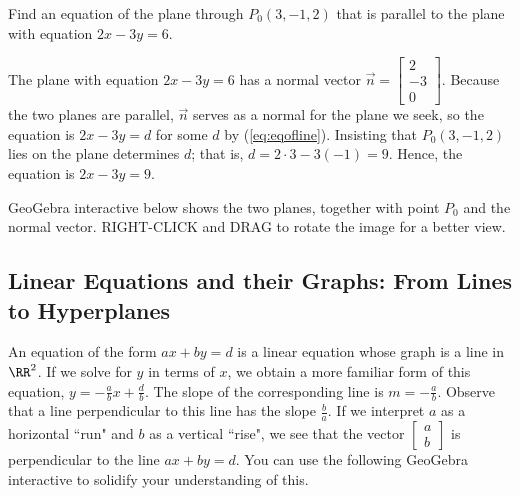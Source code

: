 \documentclass{ximera}
\begin{document}
\begin{example}\label{ex:planeparalleltoplane}
Find an equation of the plane through $P_{0}(3, -1, 2)$ that is parallel to the plane with equation $2x - 3y = 6$.

\begin{explanation}
The plane with equation $2x -3y = 6$ has a normal vector $\vec{n} =
\begin{bmatrix}
2\\
-3\\
0
\end{bmatrix}$. Because the two planes are parallel, $\vec{n}$ serves as a normal for the plane we seek, so the equation is $2x - 3y = d$ for some $d$ by (\ref{eq:eqofline}). Insisting that $P_{0}(3, -1, 2)$ lies on the plane determines $d$; that is, $d = 2 \cdot 3 - 3(-1) = 9$. Hence, the equation is $2x - 3y = 9$.

GeoGebra interactive below shows the two planes, together with point $P_0$ and the normal vector.  RIGHT-CLICK and DRAG to rotate the image for a better view.


\begin{onlineOnly}
\begin{center} 
\end{center}
\end{onlineOnly}
\end{explanation}
\end{example}

\subsection*{Linear Equations and their Graphs: From Lines to Hyperplanes}
An equation of the form $ax+by=d$ is a linear equation whose graph is a line in $\RR^2$. If we solve for $y$ in terms of $x$, we obtain a more familiar form of this equation, $y=-\frac{a}{b}x+\frac{d}{b}$.  The slope of the corresponding line is $m=-\frac{a}{b}$.  Observe that a line perpendicular to this line has the slope $\frac{b}{a}$.  If we interpret $a$ as a horizontal ``run" and $b$ as a vertical ``rise", we see that the vector $\begin{bmatrix}a\\b\end{bmatrix}$ is perpendicular to the line $ax+by=d$.  You can use the following GeoGebra interactive to solidify your understanding of this.
\end{document}
